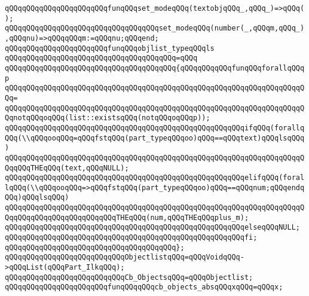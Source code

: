 \verb|qQQqqQQqqQQqqQQqqQQqqQQqfunqQQqset_modeqQQq(textobjqQQq_,qQQq_)=>qQQq();|\newline
\verb|qQQqqQQqqQQqqQQqqQQqqQQqqQQqqQQqqQQqset_modeqQQq(number(_,qQQqm,qQQq_),qQQqnu)=>qQQqqQQqm:=qQQqnu;qQQqend;|\newline
\newline
\newline
\verb|qQQqqQQqqQQqqQQqqQQqqQQqfunqQQqobjlist_typeqQQqls|\newline
\verb|qQQqqQQqqQQqqQQqqQQqqQQqqQQqqQQqqQQqqQQq=qQQq|\newline
\verb|qQQqqQQqqQQqqQQqqQQqqQQqqQQqqQQqqQQqqQQq{qQQqqQQqqQQqfunqQQqforallqQQqp|\newline
\verb|qQQqqQQqqQQqqQQqqQQqqQQqqQQqqQQqqQQqqQQqqQQqqQQqqQQqqQQqqQQqqQQqqQQqqQQq=|\newline
\verb|qQQqqQQqqQQqqQQqqQQqqQQqqQQqqQQqqQQqqQQqqQQqqQQqqQQqqQQqqQQqqQQqqQQqqQQqnotqQQqoqQQq(list::existsqQQq(notqQQqoqQQqp));|\newline
\newline
\verb|qQQqqQQqqQQqqQQqqQQqqQQqqQQqqQQqqQQqqQQqqQQqqQQqqQQqqQQqifqQQq(forallqQQq(\\qQQqooqQQq=qQQqfstqQQq(part_typeqQQqoo)qQQq==qQQqtext)qQQqlsqQQq)|\newline
\verb|qQQqqQQqqQQqqQQqqQQqqQQqqQQqqQQqqQQqqQQqqQQqqQQqqQQqqQQqqQQqqQQqqQQqqQQqqQQqTHEqQQq(text,qQQqNULL);|\newline
\verb|qQQqqQQqqQQqqQQqqQQqqQQqqQQqqQQqqQQqqQQqqQQqqQQqqQQqqQQqelifqQQq(forallqQQq(\\qQQqooqQQq=>qQQqfstqQQq(part_typeqQQqoo)qQQq==qQQqnum;qQQqendqQQq)qQQqlsqQQq)|\newline
\verb|qQQqqQQqqQQqqQQqqQQqqQQqqQQqqQQqqQQqqQQqqQQqqQQqqQQqqQQqqQQqqQQqqQQqqQQqqQQqqQQqqQQqqQQqqQQqqQQqTHEqQQq(num,qQQqTHEqQQqplus_m);|\newline
\verb|qQQqqQQqqQQqqQQqqQQqqQQqqQQqqQQqqQQqqQQqqQQqqQQqqQQqqQQqelseqQQqNULL;|\newline
\verb|qQQqqQQqqQQqqQQqqQQqqQQqqQQqqQQqqQQqqQQqqQQqqQQqqQQqqQQqfi;|\newline
\verb|qQQqqQQqqQQqqQQqqQQqqQQqqQQqqQQqqQQqqQQq};|\newline
\newline
\verb|qQQqqQQqqQQqqQQqqQQqqQQqqQQqObjectlistqQQq=qQQqVoidqQQq->qQQqList(qQQqPart_IlkqQQq);|\newline
\verb|qQQqqQQqqQQqqQQqqQQqqQQqqQQqCb_ObjectsqQQq=qQQqObjectlist;|\newline
\newline
\verb|qQQqqQQqqQQqqQQqqQQqqQQqfunqQQqqQQqcb_objects_absqQQqxqQQq=qQQqx;|\newline
